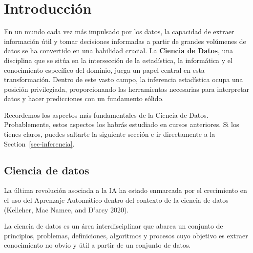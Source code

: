 \documentclass[
  letterpaper,
  DIV=11,
  numbers=noendperiod]{scrreprt}
\begin{document}

\hypertarget{sec-intro}{%
\chapter{Introducción}\label{sec-intro}}

En un mundo cada vez más impulsado por los datos, la capacidad de
extraer información útil y tomar decisiones informadas a partir de
grandes volúmenes de datos se ha convertido en una habilidad crucial. La
\textbf{Ciencia de Datos}, una disciplina que se sitúa en la
intersección de la estadística, la informática y el conocimiento
específico del dominio, juega un papel central en esta transformación.
Dentro de este vasto campo, la inferencia estadística ocupa una posición
privilegiada, proporcionando las herramientas necesarias para
interpretar datos y hacer predicciones con un fundamento sólido.

Recordemos los aspectos más fundamentales de la Ciencia de Datos.
Probablemente, estos aspectos los habrás estudiado en cursos anteriores.
Si los tienes claros, puedes saltarte la siguiente sección e ir
directamente a la Section~\ref{sec-inferencia}.

\hypertarget{ciencia-de-datos}{%
\section{Ciencia de datos}\label{ciencia-de-datos}}

La última revolución asociada a la IA ha estado enmarcada por el
crecimiento en el uso del Aprenzaje Automático dentro del contexto de la
ciencia de datos (Kelleher, Mac Namee, and D'arcy 2020).

\begin{tcolorbox}[enhanced jigsaw, arc=.35mm, breakable, coltitle=black, left=2mm, opacityback=0, bottomtitle=1mm, colbacktitle=quarto-callout-tip-color!10!white, title=\textcolor{quarto-callout-tip-color}{\faLightbulb}\hspace{0.5em}{Ciencia de datos}, titlerule=0mm, colback=white, colframe=quarto-callout-tip-color-frame, bottomrule=.15mm, rightrule=.15mm, opacitybacktitle=0.6, toptitle=1mm, toprule=.15mm, leftrule=.75mm]

La ciencia de datos es un área interdisciplinar que abarca un conjunto
de principios, problemas, definiciones, algoritmos y procesos cuyo
objetivo es extraer conocimiento no obvio y útil a partir de un conjunto
de datos.

\end{tcolorbox}
\end{document}
